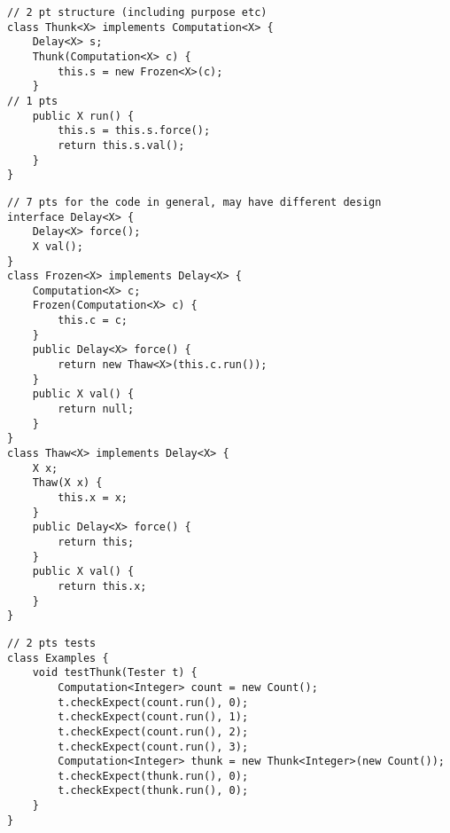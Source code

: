 \documentclass[12pt]{article}                   %
\newenvironment{solution}{\color{Red}}{}
\begin{document}
\begin{problem}
\begin{solution}
\newpage
\begin{verbatim}
// 2 pt structure (including purpose etc)
class Thunk<X> implements Computation<X> {
    Delay<X> s;
    Thunk(Computation<X> c) {
        this.s = new Frozen<X>(c);
    }
// 1 pts 
    public X run() {
        this.s = this.s.force();
        return this.s.val();
    }
}
\end{verbatim}
\newpage
\begin{verbatim}
// 7 pts for the code in general, may have different design
interface Delay<X> {
    Delay<X> force();
    X val();
}
class Frozen<X> implements Delay<X> {
    Computation<X> c;
    Frozen(Computation<X> c) {
        this.c = c;
    }
    public Delay<X> force() {
        return new Thaw<X>(this.c.run());
    }
    public X val() {
        return null;
    }
}
class Thaw<X> implements Delay<X> {
    X x;
    Thaw(X x) {
        this.x = x;
    }
    public Delay<X> force() {
        return this;
    }
    public X val() {
        return this.x;
    }
}
\end{verbatim}
\newpage
\begin{verbatim}
// 2 pts tests
class Examples {
    void testThunk(Tester t) {
        Computation<Integer> count = new Count();
        t.checkExpect(count.run(), 0);
        t.checkExpect(count.run(), 1);
        t.checkExpect(count.run(), 2);
        t.checkExpect(count.run(), 3);
        Computation<Integer> thunk = new Thunk<Integer>(new Count());
        t.checkExpect(thunk.run(), 0);
        t.checkExpect(thunk.run(), 0);
    }
}
\end{verbatim}
\end{solution}

\ifrubric
\else
{}
\fi
\newpage
\newpage

\end{problem}

\ifrubric
\else
{}
\fi
\newpage
\end{document}
